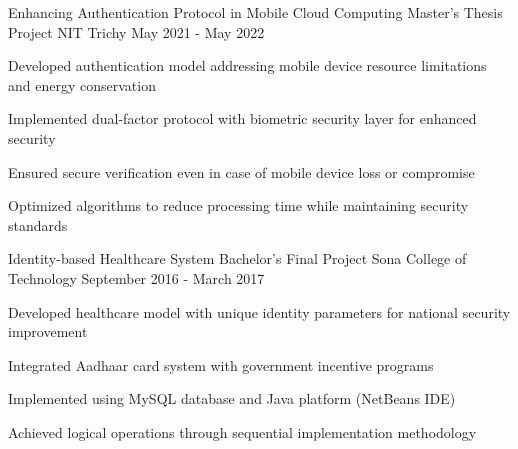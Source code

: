 \documentclass[11pt, a4paper]{awesome-cv} %
\begin{document}
\begin{cventries}
\cventry
    {Enhancing Authentication Protocol in Mobile Cloud Computing} %
    {Master's Thesis Project} %
    {NIT Trichy} %
    {May 2021 - May 2022} %
    {
      \begin{cvitems}
        \item {Developed authentication model addressing mobile device resource limitations and energy conservation}
        \item {Implemented dual-factor protocol with biometric security layer for enhanced security}
        \item {Ensured secure verification even in case of mobile device loss or compromise}
        \item {Optimized algorithms to reduce processing time while maintaining security standards}
      \end{cvitems}
    }

\cventry
    {Identity-based Healthcare System} %
    {Bachelor's Final Project} %
    {Sona College of Technology} %
    {September 2016 - March 2017} %
    {
      \begin{cvitems}
        \item {Developed healthcare model with unique identity parameters for national security improvement}
        \item {Integrated Aadhaar card system with government incentive programs}
        \item {Implemented using MySQL database and Java platform (NetBeans IDE)}
        \item {Achieved logical operations through sequential implementation methodology}
      \end{cvitems}
    }
\end{cventries}



\end{document}
